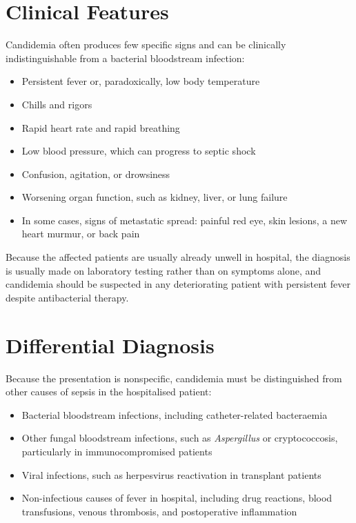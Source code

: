\section*{Clinical Features}
Candidemia often produces few specific signs and can be clinically indistinguishable from a bacterial bloodstream infection:
\begin{itemize}
    \item Persistent fever or, paradoxically, low body temperature
    \item Chills and rigors
    \item Rapid heart rate and rapid breathing
    \item Low blood pressure, which can progress to septic shock
    \item Confusion, agitation, or drowsiness
    \item Worsening organ function, such as kidney, liver, or lung failure
    \item In some cases, signs of metastatic spread: painful red eye, skin lesions, a new heart murmur, or back pain
\end{itemize}
Because the affected patients are usually already unwell in hospital, the diagnosis is usually made on laboratory testing rather than on symptoms alone, and candidemia should be suspected in any deteriorating patient with persistent fever despite antibacterial therapy.

\section*{Differential Diagnosis}
Because the presentation is nonspecific, candidemia must be distinguished from other causes of sepsis in the hospitalised patient:
\begin{itemize}
    \item Bacterial bloodstream infections, including catheter-related bacteraemia
    \item Other fungal bloodstream infections, such as \textit{Aspergillus} or cryptococcosis, particularly in immunocompromised patients
    \item Viral infections, such as herpesvirus reactivation in transplant patients
    \item Non-infectious causes of fever in hospital, including drug reactions, blood transfusions, venous thrombosis, and postoperative inflammation
\end{itemize}

